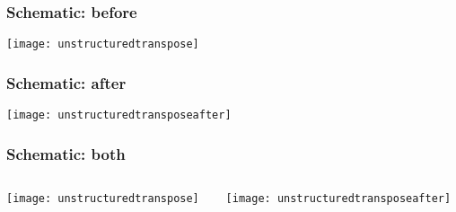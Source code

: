 \documentclass[presentation,aspectratio=43,10pt]{beamer}
\begin{document}
\begin{frame}
  \frametitle{Schematic: before}
  \begin{center}
    \texttt{[image: unstructuredtranspose]}
  \end{center}
\end{frame}

\begin{frame}
  \frametitle{Schematic: after}
  \begin{center}
    \texttt{[image: unstructuredtransposeafter]}
  \end{center}
\end{frame}

\begin{frame}
  \frametitle{Schematic: both}
  \begin{columns}
    \begin{column}{0.45\textwidth}
      \texttt{[image: unstructuredtranspose]}
    \end{column}
    \begin{column}{0.45\textwidth}
      \texttt{[image: unstructuredtransposeafter]}
    \end{column}
  \end{columns}
\end{frame}
\end{document}
